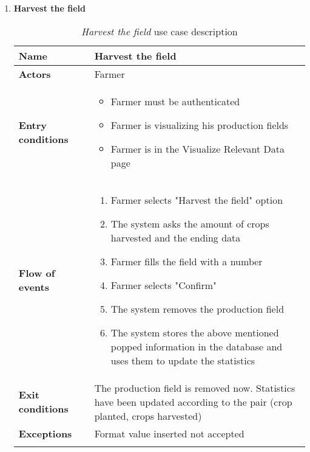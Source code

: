 \begin{enumerate}
				\FloatBarrier
				\newpage
			\item \textbf{Harvest the field}
				\begin{longtable}{p{0.26\linewidth}p{0.75\linewidth}}
					\toprule
					\textbf{Name} & \textbf{Harvest the field} \\
					\midrule
					\textbf{Actors} & Farmer \\
					\midrule
					\textbf{Entry conditions} & \begin{itemize}
													\item Farmer must be authenticated
													\item Farmer is visualizing his production fields
													\item Farmer is in the Visualize Relevant Data page
												\end{itemize} \\
					\midrule
					\textbf{Flow of events} & 
					\begin{enumerate}
						\item Farmer selects "Harvest the field" option
						\item The system asks the amount of crops harvested and the ending data
						\item Farmer fills the field with a number
						\item Farmer selects "Confirm"
						\item The system removes the production field
						\item The system stores the above mentioned popped information in the database and uses them to update the statistics
					\end{enumerate} \\
					\midrule
					\textbf{Exit conditions} &  The production field is removed now. Statistics have been updated according to the pair (crop planted, crops harvested)\\
					\midrule
					\textbf{Exceptions} &  Format value inserted not accepted\\
					\bottomrule
					\caption{\emph{Harvest the field} use case description}
				\end{longtable}
			

\end{enumerate}
